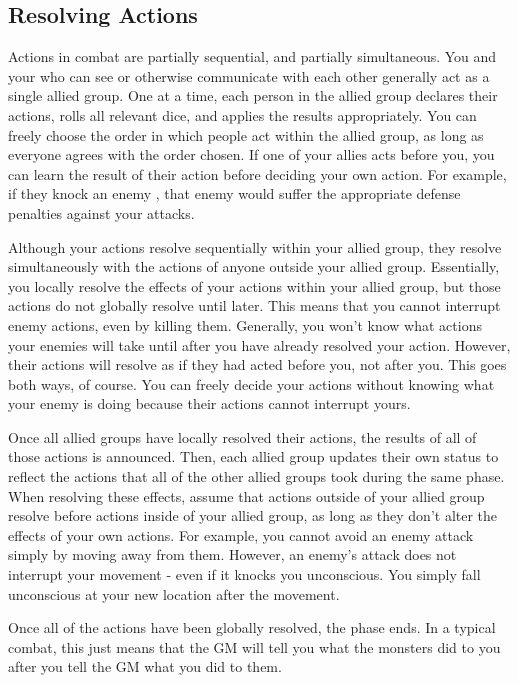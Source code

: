   \subsection{Resolving Actions}\label{Resolving Actions}

    Actions in combat are partially sequential, and partially simultaneous.
    You and your  who can see or otherwise communicate with each other generally act as a single allied group.
    One at a time, each person in the allied group declares their actions, rolls all relevant dice, and applies the results appropriately.
    You can freely choose the order in which people act within the allied group, as long as everyone agrees with the order chosen.
    If one of your allies acts before you, you can learn the result of their action before deciding your own action.
    For example, if they knock an enemy \prone, that enemy would suffer the appropriate defense penalties against your attacks.

    Although your actions resolve sequentially within your allied group, they resolve simultaneously with the actions of anyone outside your allied group.
    Essentially, you locally resolve the effects of your actions within your allied group, but those actions do not globally resolve until later.
    This means that you cannot interrupt enemy actions, even by killing them.
    Generally, you won't know what actions your enemies will take until after you have already resolved your action.
    However, their actions will resolve as if they had acted before you, not after you.
    This goes both ways, of course.
    You can freely decide your actions without knowing what your enemy is doing because their actions cannot interrupt yours.

    Once all allied groups have locally resolved their actions, the results of all of those actions is announced.
    Then, each allied group updates their own status to reflect the actions that all of the other allied groups took during the same phase.
    When resolving these effects, assume that actions outside of your allied group resolve before actions inside of your allied group, as long as they don't alter the effects of your own actions.
    For example, you cannot avoid an enemy attack simply by moving away from them.
    However, an enemy's attack does not interrupt your movement - even if it knocks you unconscious.
    You simply fall unconscious at your new location after the movement.

    Once all of the actions have been globally resolved, the phase ends.
    In a typical combat, this just means that the GM will tell you what the monsters did to you after you tell the GM what you did to them.

